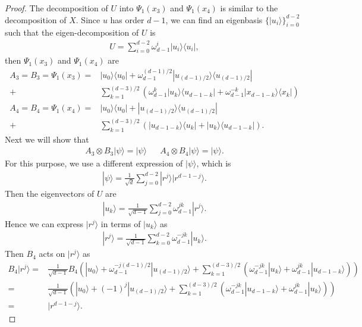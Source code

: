 \documentclass[11pt,letterpaper]{article}
\newcommand{\ket}[1]{|#1\rangle}
\newcommand{\ketbra}[2]{|#1\rangle\langle#2|}
\newcommand{\x}{\otimes}
\newcommand{\1}{\mathbb{1}}
\theoremstyle{definition}
\begin{document}
\begin{proof}
The decomposition of $U$ into $\Psi_1(x_3)$ and $\Psi_1(x_4)$ is similar to the decomposition of $X$.
Since $u$ has order $d-1$, we can find an eigenbasis $\{ \ket{u_i} \}_{i=0}^{d-2}$ such that the eigen-decomposition of $U$ is
\begin{align}
	U = \sum_{i=0}^{d-2} \omega_{d-1}^i \ketbra{u_i}{u_i},
\end{align} 
then $\Psi_1(x_3)$ and $\Psi_1(x_4)$ are  
\begin{align*}
	A_3 = B_3 =\Psi_1(x_3) = &\ketbra{u_0}{u_0} +\omega_{d-1}^{(d-1)/2}\ketbra{u_{(d-1)/2}}{u_{(d-1)/2}}\\ + 
	&\sum_{k=1}^{(d-3)/2}\left( \omega_{d-1}^k\ketbra{u_k}{u_{d-1-k}} + \omega_{d-1}^{-k}\ketbra{x_{d-1-k}}{x_k}\right)\\ 
	A_4 = B_4  =\Psi_1(x_4) = &\ketbra{u_0}{u_0} +\ketbra{u_{(d-1)/2}}{u_{(d-1)/2}} \\+
	 &\sum_{k=1}^{(d-3)/2}\left(\ketbra{u_{d-1-k}}{u_k} + \ketbra{u_k}{u_{d-1-k}}\right).
\end{align*}
Next we will show that 
\begin{align}
	A_3\x B_3 \ket{\psi} = \ket{\psi} && A_4 \x B_4 \ket{\psi} = \ket{\psi}.
\end{align}
For this purpose, we use a different expression of $\ket{\psi}$, which is
\begin{align}
	\ket{\psi} = \frac{1}{\sqrt{d}} \sum_{j=0}^{d-2} \ket{r^j} \ket{r^{d-1-j}}.
\end{align}
Then the eigenvectors of $U$ are 
\begin{align}
	\ket{u_k} = \frac{1}{\sqrt{d-1}} \sum_{j=0}^{d-2} \omega_{d-1}^{jk} \ket{r^j}.
\end{align}
Hence we can express $\ket{r^j}$ in terms of $\ket{u_k}$ as 
\begin{align}
	\ket{r^j} = \frac{1}{\sqrt{d-1}} \sum_{k=0}^{d-2} \omega_{d-1}^{-jk} \ket{u_k}.
\end{align}
Then $B_4$ acts on $\ket{r^j}$ as 
\begin{align}
	B_4 \ket{r^j} =& \frac{1}{\sqrt{d-1}} B_4\left(\ket{u_0} + \omega_{d-1}^{-j(d-1)/2}\ket{u_{(d-1)/2}}  + 
	\sum_{k=1}^{(d-3)/2} (\omega_{d-1}^{-jk} \ket{u_k} + \omega_{d-1}^{jk} \ket{u_{d-1-k}})\right) \\
	=&\frac{1}{\sqrt{d-1}} \left(\ket{u_0} + (-1)^j\ket{u_{(d-1)/2}}  + 
	\sum_{k=1}^{(d-3)/2} (\omega_{d-1}^{-jk} \ket{u_{d-1-k}} + \omega_{d-1}^{jk} \ket{u_{k}})\right) \\
	=& \ket{r^{d-1-j}}.
\end{align}

\end{proof}
\end{document}

